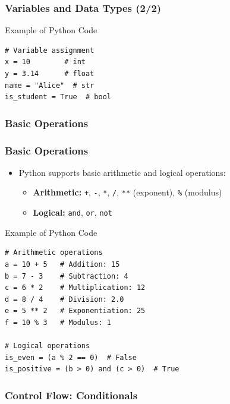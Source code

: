 \documentclass{beamer}
\begin{document}
\begin{frame}[fragile]
\frametitle{Variables and Data Types (2/2)}
\begin{block}{Example of Python Code}
\begin{verbatim}
# Variable assignment
x = 10        # int
y = 3.14      # float
name = "Alice"  # str
is_student = True  # bool
\end{verbatim}
\end{block}
\end{frame}


\subsubsection*{Basic Operations}

\begin{frame}[fragile]
\frametitle{Basic Operations}
\begin{itemize}
    \item Python supports basic arithmetic and logical operations:
    \begin{itemize}
        \item \textbf{Arithmetic:} \texttt{+}, \texttt{-}, \texttt{*}, \texttt{/}, \texttt{**} (exponent), \texttt{\%} (modulus)
        \item \textbf{Logical:} \texttt{and}, \texttt{or}, \texttt{not}
    \end{itemize}
\end{itemize}
\tiny{
\begin{block}{Example of Python Code}
\begin{verbatim}
# Arithmetic operations
a = 10 + 5   # Addition: 15
b = 7 - 3    # Subtraction: 4
c = 6 * 2    # Multiplication: 12
d = 8 / 4    # Division: 2.0
e = 5 ** 2   # Exponentiation: 25
f = 10 % 3   # Modulus: 1

# Logical operations
is_even = (a % 2 == 0)  # False
is_positive = (b > 0) and (c > 0)  # True
\end{verbatim}
\end{block}}
\end{frame}

\subsubsection*{Control Flow: Conditionals}
\end{document}
